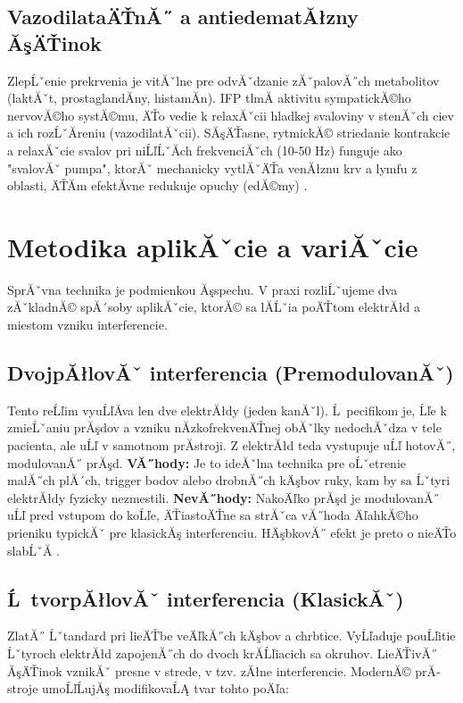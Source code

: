 \subsection{VazodilataÄŤnĂ˝ a antiedematĂłzny ĂşÄŤinok}

ZlepĹˇenie prekrvenia je vitĂˇlne pre odvĂˇdzanie zĂˇpalovĂ˝ch metabolitov (laktĂˇt, prostaglandĂ­ny, histamĂ­n). IFP tlmĂ­ aktivitu sympatickĂ©ho nervovĂ©ho systĂ©mu, ÄŤo vedie k relaxĂˇcii hladkej svaloviny v stenĂˇch ciev a ich rozĹˇĂ­reniu (vazodilatĂˇcii). SĂşÄŤasne, rytmickĂ© striedanie kontrakcie a relaxĂˇcie svalov pri niĹľĹˇĂ­ch frekvenciĂˇch (10-50 Hz) funguje ako "svalovĂˇ pumpa", ktorĂˇ mechanicky vytlĂˇÄŤa venĂłznu krv a lymfu z oblasti, ÄŤĂ­m efektĂ­vne redukuje opuchy (edĂ©my) \parencite{Capko1998}.

\section{Metodika aplikĂˇcie a variĂˇcie}

SprĂˇvna technika je podmienkou Ăşspechu. V praxi rozliĹˇujeme dva zĂˇkladnĂ© spĂ´soby aplikĂˇcie, ktorĂ© sa lĂ­Ĺˇia poÄŤtom elektrĂłd a miestom vzniku interferencie.

\subsection{DvojpĂłlovĂˇ interferencia (PremodulovanĂˇ)}

Tento reĹľim vyuĹľĂ­va len dve elektrĂłdy (jeden kanĂˇl). Ĺ pecifikom je, Ĺľe k zmieĹˇaniu prĂşdov a vzniku nĂ­zkofrekvenÄŤnej obĂˇlky nedochĂˇdza v tele pacienta, ale uĹľ v samotnom prĂ­stroji. Z elektrĂłd teda vystupuje uĹľ hotovĂ˝, modulovanĂ˝ prĂşd. \textbf{VĂ˝hody:} Je to ideĂˇlna technika pre oĹˇetrenie malĂ˝ch plĂ´ch, trigger bodov alebo drobnĂ˝ch kÄşbov ruky, kam by sa Ĺˇtyri elektrĂłdy fyzicky nezmestili. \textbf{NevĂ˝hody:} NakoÄľko prĂşd je modulovanĂ˝ uĹľ pred vstupom do koĹľe, ÄŤiastoÄŤne sa strĂˇca vĂ˝hoda ÄľahkĂ©ho prieniku typickĂˇ pre klasickĂş interferenciu. HÄşbkovĂ˝ efekt je preto o nieÄŤo slabĹˇĂ­ \parencite{Watson2020}.

\subsection{Ĺ tvorpĂłlovĂˇ interferencia (KlasickĂˇ)}

ZlatĂ˝ Ĺˇtandard pri lieÄŤbe veÄľkĂ˝ch kÄşbov a chrbtice. VyĹľaduje pouĹľitie Ĺˇtyroch elektrĂłd zapojenĂ˝ch do dvoch krĂ­Ĺľiacich sa okruhov. LieÄŤivĂ˝ ĂşÄŤinok vznikĂˇ presne v strede, v tzv. zĂłne interferencie. ModernĂ© prĂ­stroje umoĹľĹujĂş modifikovaĹĄ tvar tohto poÄľa:

